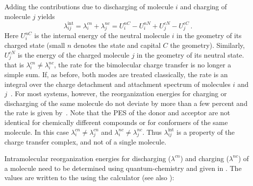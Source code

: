 Adding the contributions due to discharging of molecule $i$ and charging of 
molecule $j$ yields~\cite{bredas_charge-transfer_2004}
\begin{equation}
\lambda_{ij}^\text{int} 
=\lambda_{i}^{cn}+\lambda_{j}^{nc}=U_{i}^{nC}-U_{i}^{nN}+U_{j}^{cN}-U_{j}^{cC}\,
.
\label{equ:lambdas}
\end{equation}
Here $U_{i}^{nC}$ is the internal energy of the neutral molecule $i$ in the 
geometry of its charged state (small $n$ denotes the state and capital $C$ the 
geometry). Similarly, $U_{j}^{cN}$ is the energy of the charged molecule $j$ in  
the geometry of its neutral state.
that is  $\lambda^{cn}_i \neq \lambda^{nc}_i$, the rate for the bimolecular 
charge transfer is no longer a simple sum. If, as before, both modes are treated 
classically, the rate is an integral over the charge detachment and attachment 
spectrum of molecules $i$ and $j$~\cite{kakitani_comprehensive_1987}. For most 
systems, however, the reorganization energies for charging or discharging of the 
same molecule do not deviate by more than a few percent and the rate is given 
by~.
%
Note that the PES of the donor and acceptor are not identical for chemically 
different compounds or for conformers of the same molecule. In this case 
$\lambda_{i}^{cn} \ne \lambda_{j}^{cn}$ and  $\lambda_{i}^{nc} \ne 
\lambda_{j}^{nc}$. Thus $\lambda_{ij}^\text{int}$ is a property of the charge 
transfer complex, and not of a single molecule.

Intramolecular reorganization energies for discharging ($\lambda^{cn}$) and 
charging ($\lambda^{nc}$) of a molecule need to be determined using 
quantum-chemistry and given in \xmlmap. The values are written to the \sqlstate 
using the calculator  (see also ):


